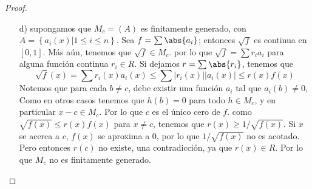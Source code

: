 \begin{proof}
\begin{enumerate}
        \item[d)] supongamos que $M_c = (A)$ es finitamente generado, con $A = \left\{ a_i(x) | 1 \leq i \leq n \right\}$. Sea $f = \sum \abs{a_i}$; entonces $\sqrt{f}$ es continua en $[0,1]$. Más aún, tenemos que $\sqrt{f} \in M_c$. por lo que $\sqrt{f} = \sum r_ia_i$ para alguna función continua $r_i \in R$. Si dejamos $r = \sum \abs{r_i}$, tenemos que
        $$ \sqrt{f}(x) = \sum r_i(x)a_i(x) \leq \sum |r_i(x)||a_i(x)| \leq r(x)f(x) $$
        Notemos que para cada $b \neq c$, debe existir una función $a_i$ tal que $a_i(b) \neq 0$, Como en otros casos tenemos que $h(b) = 0$ para todo $h \in M_c$, y en particular $x-c \in M_c$. Por lo que $c$ es el único cero de $f$. como $\sqrt{f(x)} \leq r(x)f(x)$ para $x \neq c$, tenemos que $r(x) \geq 1 / \sqrt{f(x)}$. Si $x$ se acerca a $c$, $f(x)$ se aproxima a $0$, por lo que $1 / \sqrt{f(x)}$ no es acotado. Pero entonces $r(c)$ no existe, una contradicción, ya que $r(x) \in R$. Por lo que $M_c$ no es finitamente generado.
    \end{enumerate}
\end{proof}